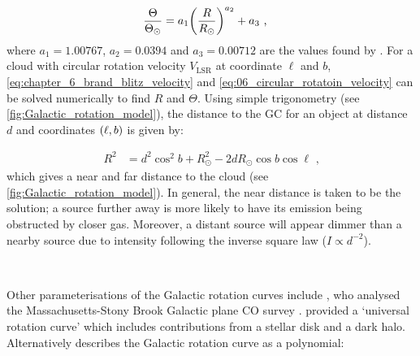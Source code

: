 \begin{equation}
    \begin{aligned}
        \frac{\Theta}{\Theta_\odot}&=a_1 \qty(\frac{R}{R_\odot})^{a_2}+a_3\text{ ,}
    \end{aligned} \label{eq:06_circular_rotatoin_velocity}
\end{equation}
\noindent where $a_1=1.00767$, $a_2=0.0394$ and $a_3=0.00712$ are the values found by \cite{1993A&A...275...67B}. For a cloud with circular rotation velocity $V_\text{LSR}$ at coordinate $\ell$ and $b$, \autoref{eq:chapter_6_brand_blitz_velocity} and \autoref{eq:06_circular_rotatoin_velocity} can be solved numerically to find $R$ and $\Theta$. Using simple trigonometry (see \autoref{fig:Galactic_rotation_model}), the distance to the GC for an object at distance $d$ and coordinates $\qty(\ell,b)$ is given by:

\begin{equation}
    \begin{aligned}
        R^2&=d^2\cos^2b+R_\odot^2-2dR_\odot\cos b\cos\ell\text{ ,}
    \end{aligned}
\end{equation}
\noindent which gives a near and far distance to the cloud (see \autoref{fig:Galactic_rotation_model}). In general, the near distance is taken to be the solution; a source further away is more likely to have its emission being obstructed by closer gas. Moreover, a distant source will appear dimmer than a nearby source due to intensity following the inverse square law ($I\propto d^{-2}$).
\par~\par 
Other parameterisations of the Galactic rotation curves include \cite{1985ApJ...295..422C}, who analysed the Massachusetts-Stony Brook Galactic plane CO survey \citep{1985ApJ...289..373S}. \cite{1996MNRAS.281...27P} provided a `universal rotation curve' which includes contributions from a stellar disk and a dark halo. Alternatively \cite{2014ApJ...783..130R} describes the Galactic rotation curve as a polynomial:

